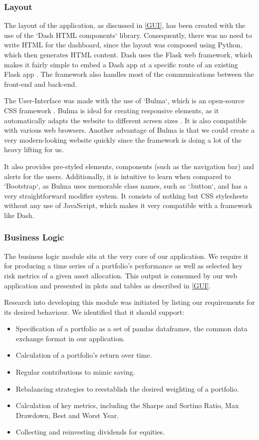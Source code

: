 \documentclass[main.tex]{subfiles}
\begin{document}
\subsubsection*{Layout}

The layout of the application, as discussed in \ref{GUI}, has been created with the use of the `Dash HTML components` library. Consequently, there was no need to write HTML for the dashboard, since the layout was composed using Python, which then generates HTML content. Dash uses the Flask web framework, which makes it fairly simple to embed a Dash app at a specific route of an existing Flask app \cite{flask-dash}. The framework also handles most of the communications between the front-end and back-end.

The User-Interface was made with the use of `Bulma`, which is an open-source CSS framework \cite{bulma}. Bulma is ideal for creating responsive elements, as it automatically adapts the website to different screen sizes \cite{responsiveness_2020}. It is also compatible with various web browsers. Another advantage of Bulma is that we could create a very modern-looking website quickly since the framework is doing a lot of the heavy lifting for us.

It also provides pre-styled elements, components (such as the navigation bar) and alerts for the users. Additionally, it is intuitive to learn when compared to `Bootstrap`, as Bulma uses memorable class names, such as `.button`, and has a very straightforward modifier system. It consists of nothing but CSS stylesheets without any use of JavaScript, which makes it very compatible with a framework like Dash.

\subsubsection{Business Logic}
\label{BL}

The business logic module sits at the very core of our application. We require it for producing a time series of a portfolio's performance as well as selected key risk metrics of a given asset allocation. This output is consumed by our web application and presented in plots and tables as described in \ref{GUI}.

Research into developing this module was initiated by listing our requirements for its desired behaviour. We identified that it should support:

\begin{itemize}
    \item Specification of a portfolio as a set of pandas dataframes, the common data exchange format in our application.
    \item Calculation of a portfolio's return over time.
    \item Regular contributions to mimic saving.
    \item Rebalancing strategies to reestablish the desired weighting of a portfolio.
    \item Calculation of key metrics, including the Sharpe and Sortino Ratio, Max Drawdown, Best and Worst Year.
    \item Collecting and reinvesting dividends for equities.
\end{itemize}
\end{document}
